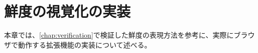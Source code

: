 \chapter{鮮度の視覚化の実装}
\label{chap:implementation}

本章では、\ref{chap:verification}で検証した鮮度の表現方法を参考に、実際にブラウザで動作する拡張機能の実装について述べる。

